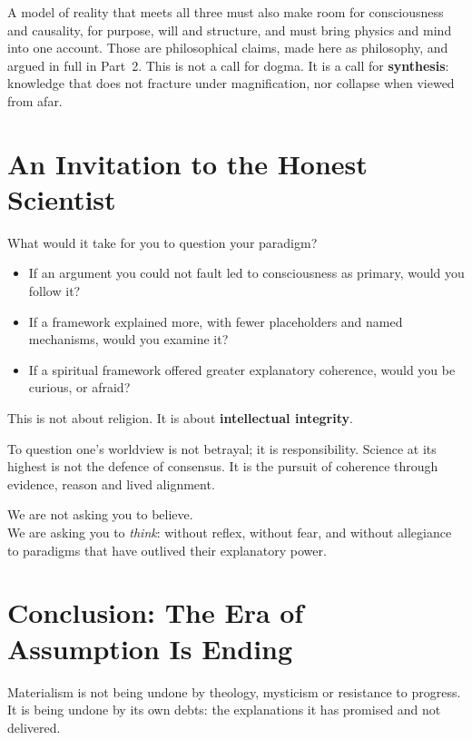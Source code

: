 \documentclass[11pt,a4paper]{article}
\begin{document}

A model of reality that meets all three must also make room for consciousness and causality, for purpose, will and structure, and must bring physics and mind into one account. Those are philosophical claims, made here as philosophy, and argued in full in Part~2. This is not a call for dogma. It is a call for \textbf{synthesis}: knowledge that does not fracture under magnification, nor collapse when viewed from afar.

\section{An Invitation to the Honest Scientist}
\label{sec:invitation}

What would it take for you to question your paradigm?
\begin{itemize}
  \item If an argument you could not fault led to consciousness as primary, would you follow it?
  \item If a framework explained more, with fewer placeholders and named mechanisms, would you examine it?
  \item If a spiritual framework offered greater explanatory coherence, would you be curious, or afraid?
\end{itemize}

This is not about religion. It is about \textbf{intellectual integrity}.

To question one's worldview is not betrayal; it is responsibility. Science at its highest is not the defence of consensus. It is the pursuit of coherence through evidence, reason and lived alignment.

We are not asking you to believe.\\
We are asking you to \textit{think}: without reflex, without fear, and without allegiance to paradigms that have outlived their explanatory power.

\section*{Conclusion: The Era of Assumption Is Ending}

Materialism is not being undone by theology, mysticism or resistance to progress. It is being undone by its own debts: the explanations it has promised and not delivered.
\end{document}
